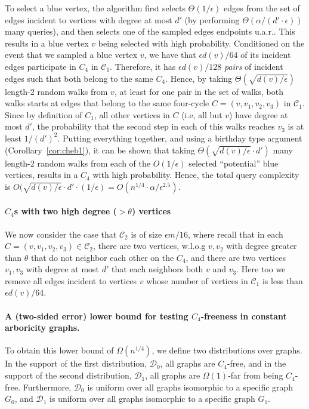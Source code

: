 \documentclass{article}
\newcommand{\eps}{\epsilon}
\newcommand{\calC}{{\mathcal{C}}}
\newcommand{\calD}{{\mathcal{D}}}
\newcommand{\talya}[1]{{} }
\newcommand{\ICALPCR}[1]{{#1}}
\begin{document}
To select a blue vertex, the algorithm first selects 
$\Theta(1/\eps)$ edges 
from the set of edges incident to vertices with degree at most $d'$ (by performing  $\Theta(\alpha/(d'\cdot \eps))$ \talya{verify}  many queries),   and then selects one of the sampled edges endpoints u.a.r.. This results in a blue vertex $v$ being selected with high probability. Conditioned on the event that we sampled a blue vertex $v$, we have that $\eps d(v)/64$ of its incident edges participate in $C_4$ in $\calC_1$. Therefore, it has $\eps d(v)/128$ \emph{pairs} of incident edges such that both belong to the same $C_4$. Hence, by taking $\Theta(\sqrt{d(v)/\eps})$ \talya{verify} length-2 random walks from $v$, at least for one pair in the set of walks, both walks starts at edges that belong to the same four-cycle $C=(v, v_1, v_2, v_3)$ in $\calC_1$. Since by definition of $C_1$, all other vertices in $C$ (i.e, all but $v$) have degree at most $d'$, the probability that the second step in each of this walks reaches $v_3$ is at least $1/(d')^2$. Putting everything together, and using a birthday type argument (Corollary~\ref{cor:cheb1}), it can be shown that taking $\Theta(\sqrt{d(v)/\eps}\cdot d')$ many length-2 random walks from each of the $O(1/\eps)$ selected  ``potential'' blue vertices, results in a $C_4$ with high probability. Hence, the total query complexity is $O(\sqrt{d(v)/\eps}\cdot d'\cdot (1/\eps)=O(n^{1/4}\cdot \alpha/\eps^{2.5})$.\talya{verify} 


\paragraph{$C_4$s with two high degree ($>\theta$) vertices}
We now consider the case that $\calC_2$ is of size $\eps m/16$, where recall that in each  $C=(v,v_1,v_2,v_3)\in \calC_2$, there are two vertices, w.l.o.g $v, v_2$ with
degree greater than $\theta$ that do not neighbor each other on the $C_4$, and there are two vertices $v_1,v_3$ with degree at most $d'$ that each neighbors both $v$ and $v_3$. Here too  we remove all edges incident to vertices $v$ whose number of vertices in $\calC_1$ is less than $\eps d(v)/64$.
\fi


\paragraph{A (two-sided error) lower bound for testing $C_4$-freeness in constant arboricity graphs.}
To obtain %
this lower bound \ICALPCR{of $\Omega(n^{1/4})$},
we define two distributions over graphs.
In the support of the first distribution, $\calD_0$, all graphs are $C_4$-free, and in the support of the second distribution, $\calD_1$, all graphs are $\Omega(1)$-far from being $C_4$-free. Furthermore, $\calD_0$ is uniform over all graphs isomorphic to a specific  graph $G_0$, and $\calD_1$ is uniform over all graphs isomorphic to a specific graph $G_1$.
\end{document}
